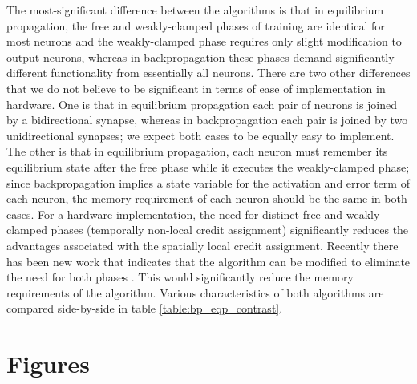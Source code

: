 \documentclass[utf8]{frontiersSCNS}
\begin{document}
\begin{appendices}
The most-significant difference between the algorithms is that in equilibrium propagation, the free
and weakly-clamped phases of training are identical for most neurons and the weakly-clamped phase 
requires only slight modification to output neurons, whereas in backpropagation these phases demand significantly-different functionality from essentially all neurons. There are two other differences that we do not believe to be significant in terms of ease of implementation in hardware. One is that in equilibrium propagation each pair of neurons is joined by a bidirectional synapse, whereas in backpropagation each pair is joined by two unidirectional synapses; we expect both cases to be equally easy to implement. The other is that in equilibrium propagation, each neuron must remember its equilibrium state after the free phase while it executes the weakly-clamped phase; since backpropagation implies a state variable for the activation and error term of each neuron, the memory requirement of each neuron should be the same in both cases.
For a hardware implementation, the need for distinct free and weakly-clamped phases (temporally non-local credit assignment) significantly reduces the advantages associated with the spatially local credit assignment. Recently there has been new work that indicates that the algorithm can be modified to eliminate the need for both phases \citep{ernoult2020}. This would significantly reduce the memory requirements of the algorithm. Various characteristics of both algorithms are compared side-by-side in table \ref{table:bp_eqp_contrast}. 

\end{appendices}

\clearpage
\section*{Figures}
\end{document}
